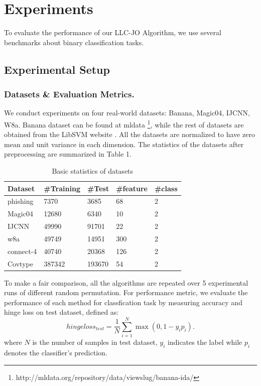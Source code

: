\documentclass{llncs}
\begin{document}
	\section{Experiments}
	To evaluate the performance of our LLC-JO Algorithm, we use several benchmarks about binary classification tasks.
	\subsection{Experimental Setup}
	\subsubsection{Datasets \& Evaluation Metrics.}
	We conduct experiments on four real-world datasets: Banana, Magic04, IJCNN, W8a. Banana dataset can be found at mldata \footnote{http://mldata.org/repository/data/viewslug/banana-ida/}, while the rest of datasets are obtained from the LibSVM website \cite{15}.  All the datasets are normalized to have zero mean and unit variance in each dimension. The statistics of the datasets after preprocessing are summarized in Table 1.
	\begin{table}
		\centering
		\begin{tabu} to \textwidth {|X[c]| X[c]| X[c]| X[c]| X[c]|}
			\hline
			Dataset              & \#Training & \#Test & \#feature &\#class\\
			\hline
			phishing 		   	& 7370 		& 3685 		& 68 	& 2  \\
			Magic04     		& 12680 	& 6340 		& 10 	& 2  \\
			IJCNN           	& 49990 	& 91701 	& 22 	& 2  \\
			w8a           		& 49749 	& 14951 	& 300 	& 2  \\
			connect-4           & 40740 	& 20368 	& 126 	& 2  \\
			Covtype           	& 387342 	& 193670 	& 54 	& 2  \\
			\hline
		\end{tabu}
		\caption{Basic statistics of datasets}
	\end{table}
	To make a fair comparison, all the algorithms are repeated over 5 experimental runs of different random permutation. For performance metric, we evaluate the performance of each method for classfication task by measuring accuracy and hinge loss on test dataset, defined as:
	\begin{equation*}
	hingeloss_{test} = \frac{1}{N}\sum_{i=1}^N\max(0,1-y_ip_i).
	\end{equation*}
	where $N$ is the number of samples in test dataset, $y_i$ indicates the label while $p_i$ denotes the classifier's prediction.
\end{document}
